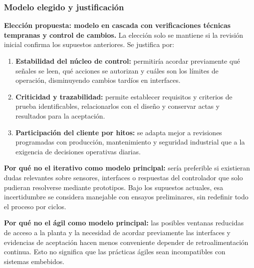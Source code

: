 \subsubsection{Modelo elegido y justificación}
\textbf{Elección propuesta: modelo en cascada con verificaciones técnicas
tempranas y control de cambios.} La elección solo se mantiene si la
revisión inicial confirma los supuestos anteriores. Se justifica por:
\begin{enumerate}
  \item \textbf{Estabilidad del núcleo de control:} permitiría acordar
  previamente qué señales se leen, qué acciones se autorizan y cuáles son
  los límites de operación, disminuyendo cambios tardíos en interfaces.
  \item \textbf{Criticidad y trazabilidad:} permite establecer requisitos
  y criterios de prueba identificables, relacionarlos con el diseño y
  conservar actas y resultados para la aceptación.
  \item \textbf{Participación del cliente por hitos:} se adapta mejor a
  revisiones programadas con producción, mantenimiento y seguridad
  industrial que a la exigencia de decisiones operativas diarias.
\end{enumerate}

\textbf{Por qué no el iterativo como modelo principal:} sería preferible
si existieran dudas relevantes sobre sensores, interfaces o respuestas del
controlador que solo pudieran resolverse mediante prototipos. Bajo los
supuestos actuales, esa incertidumbre se considera manejable con ensayos
preliminares, sin redefinir todo el proceso por ciclos.

\textbf{Por qué no el ágil como modelo principal:} las posibles ventanas
reducidas de acceso a la planta y la necesidad de acordar previamente las
interfaces y evidencias de aceptación hacen menos conveniente depender de
retroalimentación continua. Esto no significa que las prácticas ágiles
sean incompatibles con sistemas embebidos.

